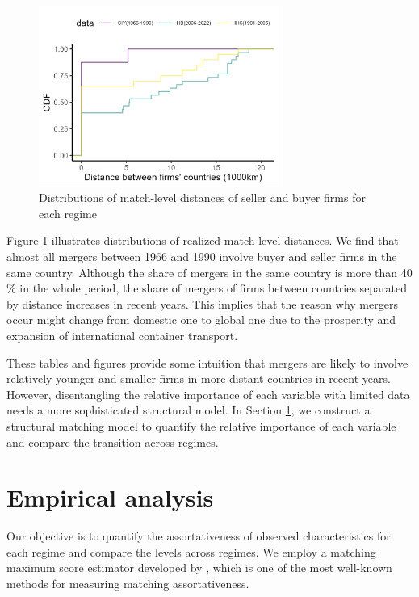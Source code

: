 \documentclass[10pt]{article}
\begin{document}
\begin{figure}[!ht]
\begin{center}
  \includegraphics[width = 0.7\textwidth]
  {figuretable/distance_cdf.png}
  \caption{Distributions of match-level distances of seller and buyer firms for each regime}
  \label{fg:distance_cdf}
  \end{center}
\footnotesize
\end{figure}


Figure \ref{fg:distance_cdf} illustrates distributions of realized match-level distances. 
We find that almost all mergers between 1966 and 1990 involve buyer and seller firms in the same country. 
Although the share of mergers in the same country is more than 40 \% in the whole period, the share of mergers of firms between countries separated by distance increases in recent years. 
This implies that the reason why mergers occur might change from domestic one to global one due to the prosperity and expansion of international container transport.

These tables and figures provide some intuition that mergers are likely to involve relatively younger and smaller firms in more distant countries in recent years. 
However, disentangling the relative importance of each variable with limited data needs a more sophisticated structural model.
In Section \ref{sec:empirical_analysis}, we construct a structural matching model to quantify the relative importance of each variable and compare the transition across regimes.




\section{Empirical analysis}\label{sec:empirical_analysis}

Our objective is to quantify the assortativeness of observed characteristics for each regime and compare the levels across regimes. 
We employ a matching maximum score estimator developed by \cite{fox2018qe}, which is one of the most well-known methods for measuring matching assortativeness.
\end{document}
